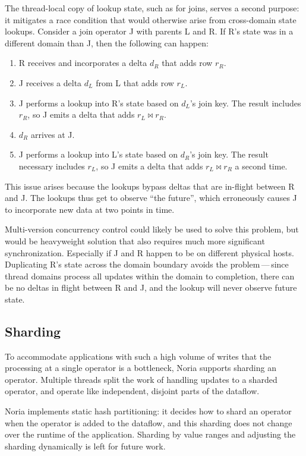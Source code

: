The thread-local copy of lookup state, such as for joins, serves a second
purpose: it mitigates a race condition that would otherwise arise from
cross-domain state lookups. Consider a join operator J with parents L and R. If
R's state was in a different domain than J, then the following can happen:

\begin{enumerate}
  \item R receives and incorporates a delta $d_R$ that adds row $r_R$.
  \item J receives a delta $d_L$ from L that adds row $r_L$.
  \item J performs a lookup into R's state based on $d_L$'s join key. The result
        includes $r_R$, so J emits a delta that adds $r_L \bowtie r_R$.
  \item $d_R$ arrives at J.
  \item J performs a lookup into L's state based on $d_R$'s join key. The result
        necessary includes $r_L$, so J emits a delta that adds $r_L \bowtie r_R$
        a second time.
\end{enumerate}

This issue arises because the lookups bypass deltas that are in-flight between R
and J. The lookups thus get to observe ``the future'', which erroneously causes
J to incorporate new data at two points in time.

Multi-version concurrency control could likely be used to solve this problem,
but would be heavyweight solution that also requires much more significant
synchronization. Especially if J and R happen to be on different physical hosts.
Duplicating R's state across the domain boundary avoids the problem\,---\,since
thread domains process all updates within the domain to completion, there can be
no deltas in flight between R and J, and the lookup will never observe future
state.

\subsection{Sharding}
\label{s:noria:sharding}

To accommodate applications with such a high volume of writes that the
processing at a single operator is a bottleneck, Noria supports sharding an
operator. Multiple threads split the work of handling updates to a sharded
operator, and operate like independent, disjoint parts of the dataflow.

Noria implements static hash partitioning: it decides how to shard an operator
when the operator is added to the dataflow, and this sharding does not change
over the runtime of the application. Sharding by value ranges and adjusting the
sharding dynamically is left for future work.

